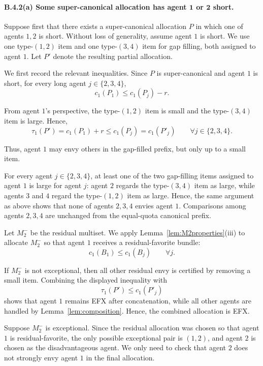 \documentclass{article}
\theoremstyle{definition}
\begin{document}
\paragraph{B.4.2(a) Some super-canonical allocation has agent $\boldsymbol{1}$ or $\boldsymbol{2}$ short.}
Suppose first that there exists a super-canonical allocation $P$ in which one
of agents $1,2$ is short.  Without loss of generality, assume agent $1$ is
short.  We use one type-$(1,2)$ item and one type-$(3,4)$ item for
gap filling, both assigned to agent $1$.  Let $P'$ denote the resulting
partial allocation.

We first record the relevant inequalities.  Since $P$ is super-canonical and
agent $1$ is short, for every long agent $j\in\{2,3,4\}$,
\[
    c_1(P_1)\le c_1(P_j)-r.
\]

From agent $1$'s perspective, the type-$(1,2)$ item is small and the
type-$(3,4)$ item is large.  Hence,
\[
    \tau_1(P')=c_1(P_1)+r\le c_1(P_j)=c_1(P'_j)
    \qquad\forall j\in\{2,3,4\}.
\]

Thus, agent $1$ may envy others in the gap-filled prefix, but only up to a
small item.

For every agent $j\in\{2,3,4\}$, at least one of the two gap-filling items
assigned to agent $1$ is large for agent $j$: agent $2$ regards the
type-$(3,4)$ item as large, while agents $3$ and $4$ regard the type-$(1,2)$
item as large.  Hence, the same argument as above shows that none of agents
$2,3,4$ envies agent $1$.  Comparisons among agents $2,3,4$ are unchanged
from the equal-quota canonical prefix.  

Let $M_2^-$ be the residual multiset.  We apply Lemma~\ref{lem:M2properties}(iii)
to allocate $M_2^-$ so that agent $1$ receives a residual-favorite bundle:
\[
    c_1(B_1)\le c_1(B_j)\qquad\forall j.
\]

If $M_2^-$ is not exceptional, then all other residual envy is certified by
removing a small item.  Combining the displayed inequality with
\[
    \tau_1(P')\le c_1(P'_j)
\]
shows that agent $1$ remains EFX after concatenation, while all other agents
are handled by Lemma~\ref{lem:composition}.  Hence, the combined allocation is
EFX.

Suppose $M_2^-$ is exceptional.  Since the residual allocation was chosen so
that agent $1$ is residual-favorite, the only possible exceptional pair is
$(1,2)$, and agent $2$ is chosen as the disadvantageous agent.  We only need
to check that agent $2$ does not strongly envy agent $1$ in the final
allocation.
\end{document}
